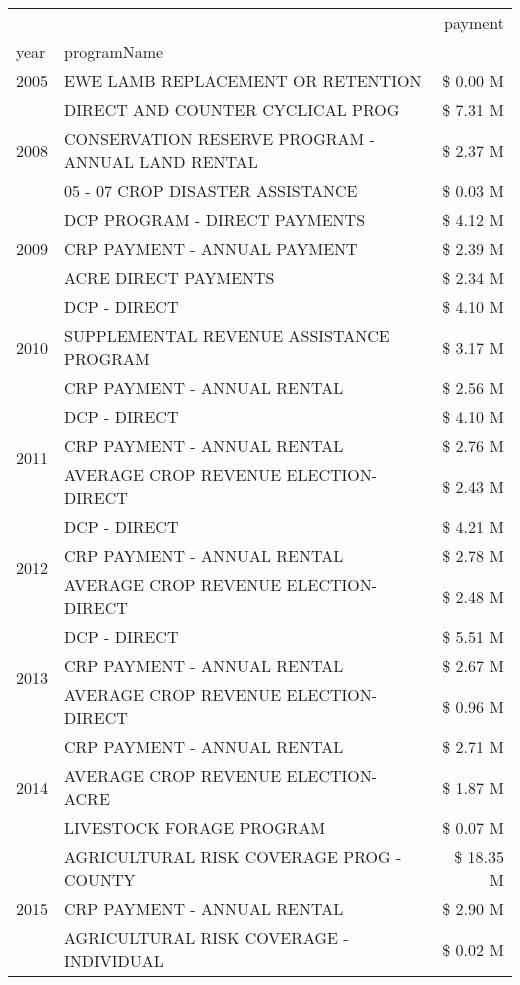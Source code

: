 \begin{tabular}{llr}
\toprule
 &  & payment \\
year & programName &  \\
\midrule
2005 & EWE LAMB REPLACEMENT OR RETENTION & \$ 0.00 M \\
\cline{1-3}
\multirow[t]{3}{*}{2008} & DIRECT AND COUNTER CYCLICAL PROG & \$ 7.31 M \\
 & CONSERVATION RESERVE PROGRAM - ANNUAL LAND RENTAL & \$ 2.37 M \\
 & 05 - 07 CROP DISASTER ASSISTANCE & \$ 0.03 M \\
\cline{1-3}
\multirow[t]{3}{*}{2009} & DCP PROGRAM - DIRECT PAYMENTS & \$ 4.12 M \\
 & CRP PAYMENT - ANNUAL PAYMENT & \$ 2.39 M \\
 & ACRE DIRECT PAYMENTS & \$ 2.34 M \\
\cline{1-3}
\multirow[t]{3}{*}{2010} & DCP - DIRECT & \$ 4.10 M \\
 & SUPPLEMENTAL REVENUE ASSISTANCE PROGRAM & \$ 3.17 M \\
 & CRP PAYMENT - ANNUAL RENTAL & \$ 2.56 M \\
\cline{1-3}
\multirow[t]{3}{*}{2011} & DCP - DIRECT & \$ 4.10 M \\
 & CRP PAYMENT - ANNUAL RENTAL & \$ 2.76 M \\
 & AVERAGE CROP REVENUE ELECTION-DIRECT & \$ 2.43 M \\
\cline{1-3}
\multirow[t]{3}{*}{2012} & DCP - DIRECT & \$ 4.21 M \\
 & CRP PAYMENT - ANNUAL RENTAL & \$ 2.78 M \\
 & AVERAGE CROP REVENUE ELECTION-DIRECT & \$ 2.48 M \\
\cline{1-3}
\multirow[t]{3}{*}{2013} & DCP - DIRECT & \$ 5.51 M \\
 & CRP PAYMENT - ANNUAL RENTAL & \$ 2.67 M \\
 & AVERAGE CROP REVENUE ELECTION-DIRECT & \$ 0.96 M \\
\cline{1-3}
\multirow[t]{3}{*}{2014} & CRP PAYMENT - ANNUAL RENTAL & \$ 2.71 M \\
 & AVERAGE CROP REVENUE ELECTION-ACRE & \$ 1.87 M \\
 & LIVESTOCK FORAGE PROGRAM & \$ 0.07 M \\
\cline{1-3}
\multirow[t]{3}{*}{2015} & AGRICULTURAL RISK COVERAGE PROG - COUNTY & \$ 18.35 M \\
 & CRP PAYMENT - ANNUAL RENTAL & \$ 2.90 M \\
 & AGRICULTURAL RISK COVERAGE - INDIVIDUAL & \$ 0.02 M \\

\end{tabular}
